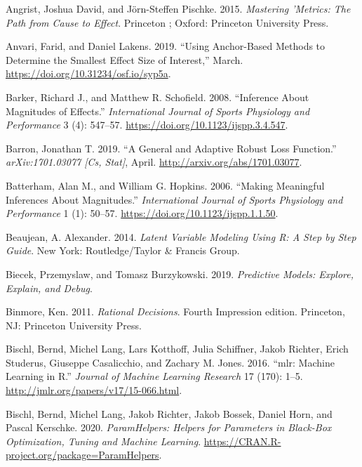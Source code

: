 \documentclass[
]{book}
\newlength{\cslhangindent}
\newenvironment{cslreferences}%
  {\setlength{\parindent}{0pt}%
  \everypar{\setlength{\hangindent}{\cslhangindent}}\ignorespaces}%
  {\par}
\begin{document}
\begin{cslreferences}
\leavevmode\hypertarget{ref-angristMasteringMetricsPath2015}{}%
Angrist, Joshua David, and Jörn-Steffen Pischke. 2015. \emph{Mastering 'Metrics: The Path from Cause to Effect}. Princeton ; Oxford: Princeton University Press.

\leavevmode\hypertarget{ref-anvariUsingAnchorBasedMethods2019}{}%
Anvari, Farid, and Daniel Lakens. 2019. ``Using Anchor-Based Methods to Determine the Smallest Effect Size of Interest,'' March. \url{https://doi.org/10.31234/osf.io/syp5a}.

\leavevmode\hypertarget{ref-barkerInferenceMagnitudesEffects2008}{}%
Barker, Richard J., and Matthew R. Schofield. 2008. ``Inference About Magnitudes of Effects.'' \emph{International Journal of Sports Physiology and Performance} 3 (4): 547--57. \url{https://doi.org/10.1123/ijspp.3.4.547}.

\leavevmode\hypertarget{ref-barronGeneralAdaptiveRobust2019}{}%
Barron, Jonathan T. 2019. ``A General and Adaptive Robust Loss Function.'' \emph{arXiv:1701.03077 {[}Cs, Stat{]}}, April. \url{http://arxiv.org/abs/1701.03077}.

\leavevmode\hypertarget{ref-batterhamMakingMeaningfulInferences2006}{}%
Batterham, Alan M., and William G. Hopkins. 2006. ``Making Meaningful Inferences About Magnitudes.'' \emph{International Journal of Sports Physiology and Performance} 1 (1): 50--57. \url{https://doi.org/10.1123/ijspp.1.1.50}.

\leavevmode\hypertarget{ref-beaujeanLatentVariableModeling2014}{}%
Beaujean, A. Alexander. 2014. \emph{Latent Variable Modeling Using R: A Step by Step Guide}. New York: Routledge/Taylor \& Francis Group.

\leavevmode\hypertarget{ref-biecekPredictiveModelsExplore2019}{}%
Biecek, Przemyslaw, and Tomasz Burzykowski. 2019. \emph{Predictive Models: Explore, Explain, and Debug}.

\leavevmode\hypertarget{ref-binmoreRationalDecisions2011}{}%
Binmore, Ken. 2011. \emph{Rational Decisions}. Fourth Impression edition. Princeton, NJ: Princeton University Press.

\leavevmode\hypertarget{ref-R-mlr}{}%
Bischl, Bernd, Michel Lang, Lars Kotthoff, Julia Schiffner, Jakob Richter, Erich Studerus, Giuseppe Casalicchio, and Zachary M. Jones. 2016. ``mlr: Machine Learning in R.'' \emph{Journal of Machine Learning Research} 17 (170): 1--5. \url{http://jmlr.org/papers/v17/15-066.html}.

\leavevmode\hypertarget{ref-R-ParamHelpers}{}%
Bischl, Bernd, Michel Lang, Jakob Richter, Jakob Bossek, Daniel Horn, and Pascal Kerschke. 2020. \emph{ParamHelpers: Helpers for Parameters in Black-Box Optimization, Tuning and Machine Learning}. \url{https://CRAN.R-project.org/package=ParamHelpers}.


\end{cslreferences}
\end{document}
